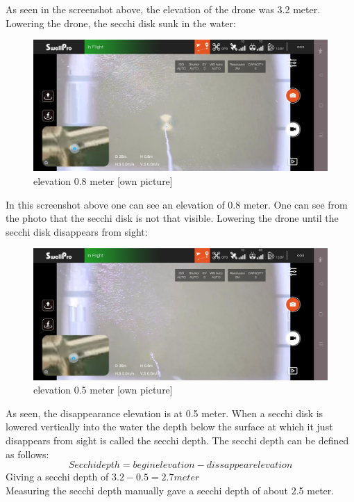 As seen in the screenshot above, the elevation of the drone was 3.2 meter. Lowering the drone, the secchi disk sunk in the water:

\begin{figure}[h]
\centering
\includegraphics[scale=0.3]{080_testing/flights/53_screen2.jpg}
\caption{elevation 0.8 meter [own picture]}
\end{figure}

In this screenshot above one can see an elevation of 0.8 meter. One can see from the photo that the secchi disk is not that visible. Lowering the drone until the secchi disk disappears from sight:

\begin{figure}[h]
\centering
\includegraphics[scale=1.2]{080_testing/flights/54_screen3.jpg}
\caption{elevation 0.5 meter [own picture]}
\end{figure}

As seen, the disappearance elevation is at 0.5 meter. When a secchi disk is lowered vertically into the water the depth below the surface at which it just disappears from sight is called the secchi depth. The secchi depth can be defined as follows:
\[ Secchi depth = begin elevation - dissappear elevation \]
Giving a secchi depth of $3.2-0.5=2.7 meter$\\

Measuring the secchi depth manually gave a secchi depth of about 2.5 meter.

